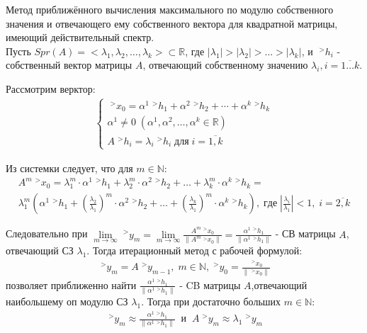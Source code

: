 \documentclass[__main__.tex]{subfiles}
\begin{document}
Метод приближённого вычисления максимального по модулю собственного значения и отвечающего ему собственного вектора для квадратной матрицы, имеющий действительный спектр.\\

Пусть $Spr(A) = < \lambda_1, \lambda_2, \dots, \lambda_k > \subset \mathbb{R}$, где $|\lambda_1| > |\lambda_2| > \dots > |\lambda_k|$, и $\;^{>}h_i$ - собственный вектор матрицы $A$, отвечающий собственному значению $\lambda_i, i = \overline{1\dots k}.$

Рассмотрим верктор:
\begin{gather*}
	\begin{cases}
		\;^{>}x_0 = \alpha^1\;^{>}h_1+\alpha^2\;^{>}h_2+\cdots+\alpha^k\;^{>}h_k \\
		\alpha^1\ne 0 \;( \alpha^1, \alpha^2, \dots, \alpha^k \in \mathbb{R})\\
		A\;^{>}h_i = \lambda_i\;^{>}h_i\;для\;i=\overline{1,k}
	\end{cases}
\end{gather*}


Из системки следует, что для $m\in\mathbb{N}:$
\begin{gather*}
	A^m\;^{>}x_0 = \lambda^{m}_1\cdot\alpha^1\;^{>}h_1+\lambda^{m}_2\cdot\alpha^2\;^{>}h_2+\dots+\lambda^m_k\cdot\alpha^k\;^{>}h_k=\\
	\lambda^m_1\left(\alpha^1\;^{>}h_1+
	\left(\frac{\lambda_2}{\lambda_1}\right)^m\cdot\alpha^2\;^{>}h_2+\dots+
	\left(\frac{\lambda_k}{\lambda_1}\right)^m\cdot\alpha^k\;^{>}h_k\right),\;где\; \left|\frac{\lambda_i}{\lambda_1}\right|<1,\;i=\overline{2,k}
\end{gather*}

Следовательно при $\lim\limits_{m\rightarrow\infty}\;^{>}y_m = \lim\limits_{m\rightarrow\infty} \frac{A^m\;^{>}x_0}{\|A^m\;^{>}x_0\|}=
\frac{\alpha^1\;^{>}h_1}{\|\alpha^1\;^{>}h_1\|}$ - СВ матрицы $A$, отвечающий СЗ $\lambda_1.$ Тогда итерационный метод с рабочей формулой:
\begin{gather*}
	\;^{>}y_m = A\;^{>}y_{m-1},\;m\in\mathbb{N},\;^{>}y_0 = \frac{\;^{>}x_0}{\|\;^{>}x_0\|}
\end{gather*}
позволяет приближенно найти $\frac{\alpha^1\;^{>}h_1}{\|\alpha^1\;^{>}h_1\|}$ - CB матрицы $A$,отвечающий наибольшему оп модулю СЗ $\lambda_1.$ Тогда при достаточно больших $m\in\mathbb{N}:$
\begin{gather*}
	\;^{>}y_m \approx \frac{\alpha^1\;^{>}h_1}{\|\alpha^1\;^{>}h_1\|}\;\;и\;\;A\;^{>}y_m \approx \lambda_1\;^{>}y_m
\end{gather*}
\end{document}
